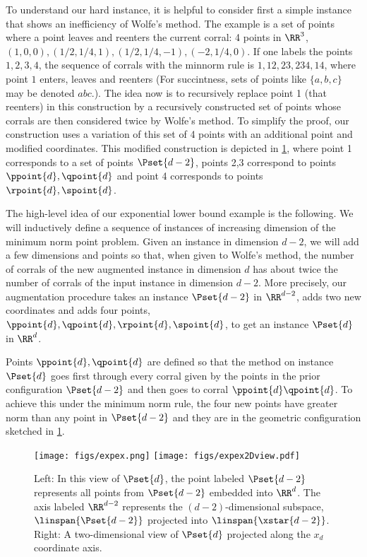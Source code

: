 To understand our hard instance, it is helpful to consider first a simple instance that shows an inefficiency of Wolfe's method. 
The example is a set of points where a point leaves and reenters the current corral: 
4 points in $\RR^3$, $(1,0,0), (1/2,1/4,1), (1/2,1/4,-1), (-2,1/4,0)$. 
If one labels the points $1,2,3,4$, the sequence of corrals with the minnorm rule is $1,12,23,234,14$, where point $1$ enters, leaves and reenters (For succintness, sets of points like $\{a,b,c\}$ may be denoted $abc$.). 
The idea now is to recursively replace point 1 (that reenters) in this construction by a recursively constructed set of points whose corrals are then considered twice by Wolfe's method. 
To simplify the proof, our construction uses a variation of this set of 4 points with an additional point and modified coordinates. This modified construction is depicted in \cref{fig:pq}, where point 1 corresponds to a set of points $\Pset{d-2}$, points 2,3 correspond to points $\ppoint{d}, \qpoint{d}$ and point 4 corresponds to points $\rpoint{d}, \spoint{d}$.

The high-level idea of our exponential lower bound example is the following.
We will inductively define a sequence of instances of increasing dimension of the minimum norm point problem. 
Given an instance in dimension $d-2$, we will add a few dimensions and points so that, when given to Wolfe's method, the number of corrals of the new augmented instance in dimension $d$ has about twice the number of corrals of the 
input instance in dimension $d-2$. More precisely, our augmentation procedure takes an instance $\Pset{d-2}$ in $\RR^{d-2}$, adds two new coordinates and adds four points, $\ppoint{d}, \qpoint{d}, \rpoint{d}, \spoint{d}$, to get an instance $\Pset{d}$ in $\RR^d$. 

Points $\ppoint{d}, \qpoint{d}$ are defined so that the method on instance $\Pset{d}$ goes first through every corral given by the points in the prior configuration $\Pset{d-2}$ and then goes to corral $\ppoint{d} \qpoint{d}$. 
To achieve this under the minimum norm rule, the four new points have greater norm than any point in $\Pset{d-2}$ and they are in the geometric configuration sketched in \cref{fig:pq}.

\begin{figure}[ht]
\centering
\texttt{[image: figs/expex.png]}
\texttt{[image: figs/expex2Dview.pdf]}
\caption{Left: In this view of $\Pset{d}$, the point labeled $\Pset{d-2}$ represents all points from $\Pset{d-2}$ embedded into $\RR^d$.  The axis labeled $\RR^{d-2}$ represents the $(d-2)$-dimensional subspace, $\linspan{\Pset{d-2}}$ projected into $\linspan{\xstar{d-2}}$.  Right: A two-dimensional view of $\Pset{d}$ projected along the $x_d$ coordinate axis.}\label{fig:pq}
\end{figure}


